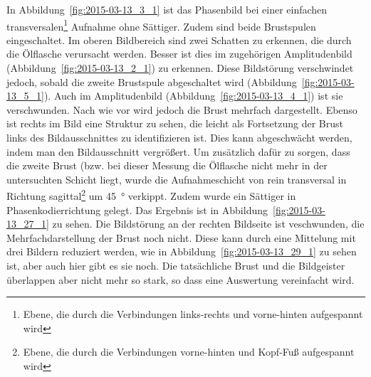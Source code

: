 \documentclass[
    11pt,
    ngerman
]{scrreprt}
\begin{document}
In Abbildung~\ref{fig:2015-03-13_3_1} ist das Phasenbild bei einer einfachen
transversalen\footnote{Ebene, die durch die Verbindungen links-rechts und
vorne-hinten aufgespannt wird} Aufnahme ohne Sättiger. Zudem sind beide
Brustspulen eingeschaltet. Im oberen Bildbereich sind zwei Schatten zu
erkennen, die durch die Ölflasche verursacht werden. Besser ist dies im
zugehörigen Amplitudenbild (Abbildung~\ref{fig:2015-03-13_2_1}) zu erkennen.
Diese Bildstörung verschwindet jedoch, sobald die zweite Brustspule
abgeschaltet wird (Abbildung~\ref{fig:2015-03-13_5_1}). Auch im Amplitudenbild
(Abbildung~\ref{fig:2015-03-13_4_1}) ist sie verschwunden. Nach wie vor wird
jedoch die Brust mehrfach dargestellt. Ebenso ist rechts im Bild eine Struktur
zu sehen, die leicht als Fortsetzung der Brust links des Bildausschnittes zu
identifizieren ist. Dies kann abgeschwächt werden, indem man den Bildausschnitt
vergrößert. Um zusätzlich dafür zu sorgen, dass die zweite Brust (bzw. bei
dieser Messung die Ölflasche nicht mehr in der untersuchten Schicht liegt,
wurde die Aufnahmeschicht von rein transversal in Richtung
sagittal\footnote{Ebene, die durch die Verbindungen vorne-hinten und Kopf-Fuß
aufgespannt wird} um \SI{45}{\degree} verkippt. Zudem wurde ein Sättiger in
Phasenkodierrichtung gelegt. Das Ergebnis ist in
Abbildung~\ref{fig:2015-03-13_27_1} zu sehen. Die Bildstörung an der rechten
Bildseite ist veschwunden, die Mehrfachdarstellung der Brust noch nicht. Diese
kann durch eine Mittelung mit drei Bildern reduziert werden, wie in
Abbildung~\ref{fig:2015-03-13_29_1} zu sehen ist, aber auch hier gibt es sie
noch.  Die tatsächliche Brust und die Bildgeister überlappen aber nicht mehr so
stark, so dass eine Auswertung vereinfacht wird.
\end{document}
